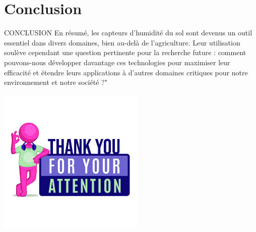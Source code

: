 \documentclass{beamer}
\begin{document}
	\section{Conclusion}
	\begin{frame}{CONCLUSION}
		En résumé, les capteurs d'humidité du sol sont devenus un outil essentiel dans divers domaines, bien au-delà de l'agriculture. Leur utilisation soulève cependant une question pertinente pour la recherche future : comment pouvons-nous développer davantage ces technologies pour maximiser leur efficacité et étendre leurs applications à d'autres domaines critiques pour notre environnement et notre société ?"
	\end{frame}
	\begin{frame}
		\centering
		\includegraphics[width=7cm]{thanks.jpg}
	\end{frame}
\end{document}
